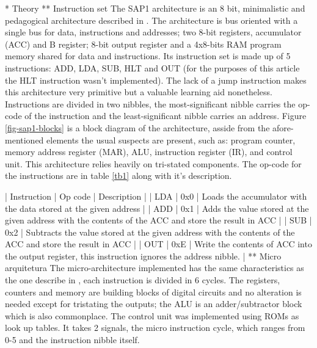 * Theory
** Instruction set
The SAP1 architecture is an 8 bit, minimalistic and pedagogical architecture described in \cite{malv}. The architecture is bus oriented with a single bus for data, instructions and addresses; two 8-bit registers, accumulator (ACC) and B register; 8-bit output register and a 4x8-bits RAM program memory shared for data and instructions. Its instruction set is made up of 5 instructions: ADD, LDA, SUB, HLT and OUT (for the purposes of this article the HLT instruction wasn't implemented). The lack of a jump instruction makes this architecture very primitive but a valuable learning aid nonetheless. Instructions are divided in two nibbles, the most-significant nibble carries the op-code of the instruction and the least-significant nibble carries an address. Figure \ref{fig-sap1-blocks} is a block diagram of the architecture, asside from the afore-mentioned elements the usual suspects are present, such as: program counter, memory address register (MAR), ALU, instruction register (IR), and control unit. This architecture relies heavily on tri-stated components. The op-code for the instructions are in table \ref{tb1} along with it's description.

| Instruction | Op code | Description                                                                                              |
| LDA         |     0x0 | Loads the accumulator with the data stored at the given address                                          |
| ADD         |     0x1 | Adds the value stored at the given address with the contents of the ACC and store the result in ACC      |
| SUB         |     0x2 | Subtracts the value stored at the given address with the contents of the ACC and store the result in ACC |
| OUT         |     0xE | Write the contents of ACC into the output register, this instruction ignores the address nibble.         |
** Micro arquitetura
The micro-architecture implemented has the same characteristics as the one describe in \cite{malv}, each instruction is divided in 6 cycles. The registers, counters and memory are building blocks of digital circuits and no alteration is needed except for tristating the outputs; the ALU is an adder/subtractor block which is also commonplace. The control unit was implemented using ROMs as look up tables. It takes 2 signals, the micro instruction cycle, which ranges from 0-5 and the instruction nibble itself.

